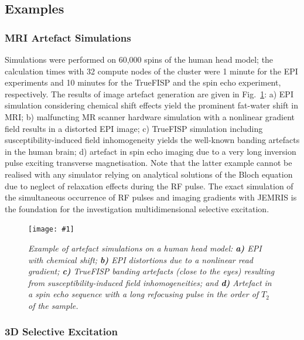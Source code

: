 \documentclass[journal,onecolumn,12pt]{IEEEtran}
\newcommand{\epsfig}[5]{
 \begin{figure}[#4!]
   \begin{center}
    \texttt{[image: \#1]}
    \caption{{\sl #2}\label{#3}}
   \end{center}
 \end{figure}}
\begin{document}

\subsection{Examples}\label{ssec:ex}

\subsubsection{MRI Artefact Simulations}

Simulations were performed on 60,000 spins of the human head model; the calculation times with 32 compute nodes of the
cluster were 1 minute for the EPI experiments and 10 minutes for the TrueFISP and the spin echo experiment,
respectively.  The results of image artefact generation are given in Fig.~\ref{fig:artefacts}: a) EPI simulation
considering chemical shift effects yield the prominent fat-water shift in MRI; b) malfuncting MR scanner hardware
simulation with a nonlinear gradient field results in a distorted EPI image; c) TrueFISP simulation including
susceptibility-induced field inhomogeneity yields the well-known banding artefacts in the human brain; d) artefact in
spin echo imaging due to a very long inversion pulse exciting transverse magnetisation. Note that the latter example
cannot be realised with any simulator relying on analytical solutions of the Bloch equation due to neglect of relaxation
effects during the RF pulse. The exact simulation of the simultaneous occurrence of RF pulses and imaging gradients with
JEMRIS is the foundation for the investigation multidimensional selective excitation.\\ 

\epsfig{fig/artifacts.eps}{Example of artefact simulations on a human head model: {\bf a)} EPI with chemical shift; {\bf
    b)} EPI distortions due to a nonlinear read gradient; {\bf c)} TrueFISP banding artefacts (close to the eyes)
  resulting from susceptibility-induced field inhomogeneities; and {\bf d)} Artefact in a spin echo sequence with a long
  refocusing pulse in the order of $T_2$ of the sample.}{fig:artefacts}{tp}{1.0}



\subsubsection{3D Selective Excitation}
\end{document}
